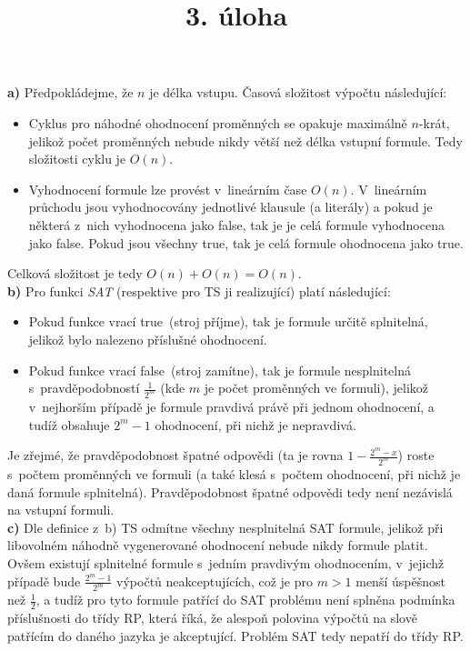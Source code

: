 \documentclass[a4paper]{article}
\title {3. úloha}
\newcommand{\fls}{false}
\newcommand{\tre}{true}
\begin{document}
\section*{}
\textbf{a)} Předpokládejme, že $n$ je délka vstupu.
Časová složitost výpočtu následující:
\begin{itemize}
    \item Cyklus pro náhodné ohodnocení proměnných se opakuje maximálně $n$-krát, jelikož počet proměnných nebude nikdy větší než
     délka vstupní formule.
    Tedy složitosti cyklu je $O(n)$.
    \item Vyhodnocení formule lze provést v~lineárním čase $O(n)$.
    V~lineárním průchodu jsou vyhodnocovány jednotlivé klausule (a literály) a pokud je některá z~nich vyhodnocena jako \fls, tak je
    je celá formule vyhodnocena jako \fls.
    Pokud jsou všechny \tre, tak je celá formule ohodnocena jako \tre.
\end{itemize}
Celková složitost je tedy $O(n)+O(n)=O(n)$.
\\

\noindent\textbf{b)} Pro funkci \emph{SAT} (respektive pro TS ji realizující) platí následující:
\begin{itemize}
    \item Pokud funkce vrací \tre\ (stroj příjme), tak je formule určitě splnitelná, jelikož bylo nalezeno příslušné ohodnocení.
    \item Pokud funkce vrací \fls\ (stroj zamítne), tak je formule nesplnitelná s~pravděpodobností $\frac{1}{2^m}$ (kde $m$ je počet proměnných
    ve formuli), jelikož v~nejhorším případě je formule pravdivá právě při jednom ohodnocení, a tudíž obsahuje $2^m-1$ ohodnocení,
    při nichž je nepravdivá.
\end{itemize}
Je zřejmé, že pravděpodobnost špatné odpovědi (ta je rovna $1-\frac{2^m-x}{2^m}$) roste s~počtem proměnných ve formuli
(a také klesá s~počtem ohodnocení, při nichž je daná formule splnitelná).
Pravděpodobnost špatné odpovědi tedy není nezávislá na vstupní formuli.
\\

\noindent\textbf{c)} Dle definice z~b) TS odmítne všechny nesplnitelná SAT formule, jelikož při libovolném náhodně vygenerované ohodnocení nebude
nikdy formule platit.
Ovšem existují splnitelné formule s~jedním pravdivým ohodnocením, v~jejichž případě bude $\frac{2^m-1}{2^m}$ výpočtů neakceptujících,
což je pro $m>1$ menší úspěšnost než $\frac{1}{2}$, a tudíž pro tyto formule patřící do SAT problému není splněna podmínka příslušnosti do třídy RP,
která říká, že alespoň polovina výpočtů na slově patřícím do daného jazyka je akceptující.
Problém SAT tedy nepatří do třídy RP.
\end{document}

